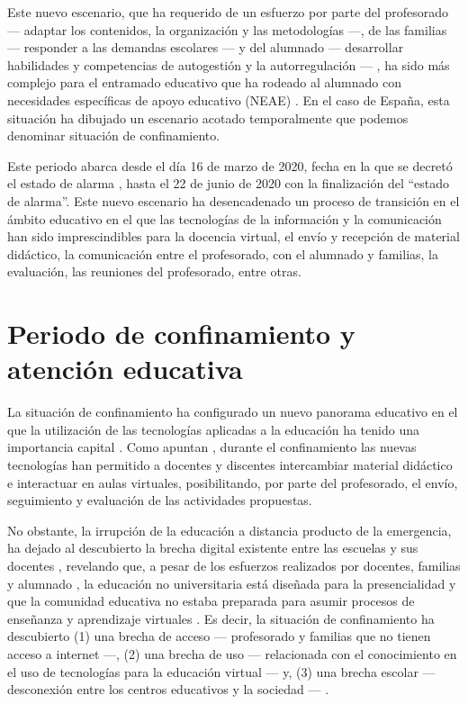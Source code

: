 \documentclass{textolivre}
\begin{document}
Este nuevo escenario, que ha requerido de un esfuerzo por parte del profesorado — adaptar los contenidos, la organización y las metodologías —, de las familias — responder a las demandas escolares — \cite{rogero2020} %
y del alumnado — desarrollar habilidades y competencias de autogestión y la autorregulación — \cite{munoz2020}, %
ha sido más complejo para el entramado educativo que ha rodeado al alumnado con necesidades específicas de apoyo educativo (NEAE) \cite{murillo2020}. %
En el caso de España, esta situación ha dibujado un escenario acotado temporalmente que podemos denominar situación de confinamiento. 
	
Este periodo abarca desde el día 16 de marzo de 2020, fecha en la que se decretó el estado de alarma \cite{realdecreto}, %
hasta el 22 de junio de 2020 con la finalización del “estado de alarma”. Este nuevo escenario ha desencadenado un proceso de transición en el ámbito educativo en el que las tecnologías de la información y la comunicación han sido imprescindibles para la docencia virtual, el envío y recepción de material didáctico, la comunicación entre el profesorado, con el alumnado y familias, la evaluación, las reuniones del profesorado, entre otras. 

\section{Periodo de confinamiento y atención educativa}
La situación de confinamiento ha configurado un nuevo panorama educativo en el que la utilización de las tecnologías aplicadas a la educación ha tenido una importancia capital \cite{ruiz2020}. %
Como apuntan \textcite{menendez2020}, %
durante el confinamiento las nuevas tecnologías han permitido a docentes y discentes intercambiar material didáctico e interactuar en aulas virtuales, posibilitando, por parte del profesorado, el envío, seguimiento y evaluación de las actividades propuestas. 

No obstante, la irrupción de la educación a distancia producto de la emergencia, ha dejado al descubierto la brecha digital existente entre las escuelas y sus docentes \cite[p. 12]{murillo2020}, %
revelando que, a pesar de los esfuerzos realizados por docentes, familias y alumnado \cite{rogero2020}, %
la educación no universitaria está diseñada para la presencialidad \cite{cabreraperez2020} %
y que la comunidad educativa no estaba preparada para asumir procesos de enseñanza y aprendizaje virtuales \cite{penate2020}. %
Es decir, la situación de confinamiento ha descubierto (1) una brecha de acceso — profesorado y familias que no tienen acceso a internet —, (2) una brecha de uso — relacionada con el conocimiento en el uso de tecnologías para la educación virtual — y, (3) una brecha escolar — desconexión entre los centros educativos y la sociedad — \cite{cotec2020}. %
\end{document}
